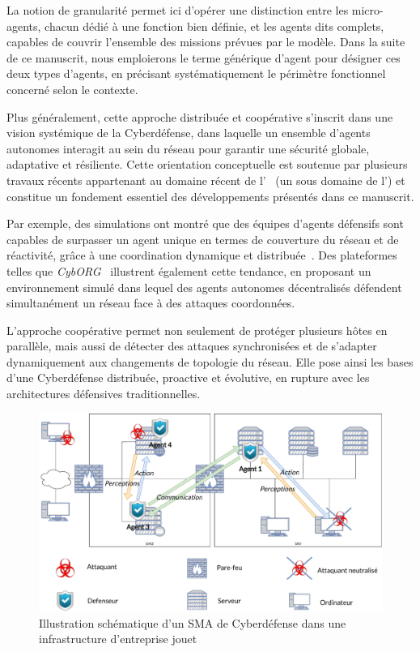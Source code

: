 La notion de granularité permet ici d'opérer une distinction entre les micro-agents, chacun dédié à une fonction bien définie, et les agents  dits complets, capables de couvrir l'ensemble des missions prévues par le modèle. Dans la suite de ce manuscrit, nous emploierons le terme générique d'agent  pour désigner ces deux types d'agents, en précisant systématiquement le périmètre fonctionnel concerné selon le contexte.

Plus généralement, cette approche distribuée et coopérative s'inscrit dans une vision systémique de la Cyberdéfense, dans laquelle un ensemble d'agents autonomes interagit au sein du réseau pour garantir une sécurité globale, adaptative et résiliente. Cette orientation conceptuelle est soutenue par plusieurs travaux récents appartenant au domaine récent de l'~\cite{Vyas2023} (un sous domaine de l') et constitue un fondement essentiel des développements présentés dans ce manuscrit.


Par exemple, des simulations ont montré que des équipes d'agents défensifs sont capables de surpasser un agent unique en termes de couverture du réseau et de réactivité, grâce à une coordination dynamique et distribuée~\cite{RLResilientCyberdefense2024}.
Des plateformes telles que \textit{CybORG}~\cite{cage_challenge_3_announcement} illustrent également cette tendance, en proposant un environnement simulé dans lequel des agents autonomes décentralisés défendent simultanément un réseau face à des attaques coordonnées.

L'approche coopérative permet non seulement de protéger plusieurs hôtes en parallèle, mais aussi de détecter des attaques synchronisées et de s'adapter dynamiquement aux changements de topologie du réseau. Elle pose ainsi les bases d'une Cyberdéfense distribuée, proactive et évolutive, en rupture avec les architectures défensives traditionnelles.

\begin{figure}[h]
  \centering
  \includegraphics[width=\linewidth]{figures/infra_MAS_illustration.pdf}
  \caption{Illustration schématique d'un SMA de Cyberdéfense dans une infrastructure d'entreprise jouet}
  \label{fig:distributed_sma}
\end{figure}

